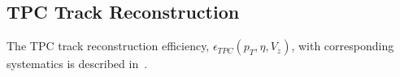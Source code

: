 \subsection{TPC Track Reconstruction}\label{section:star_TPCeffi}

The TPC track reconstruction efficiency, $\epsilon_{TPC}\left(p_T,\eta,V_{z}\right)$, with corresponding systematics is  described in~\cite{supplementaryNote}.